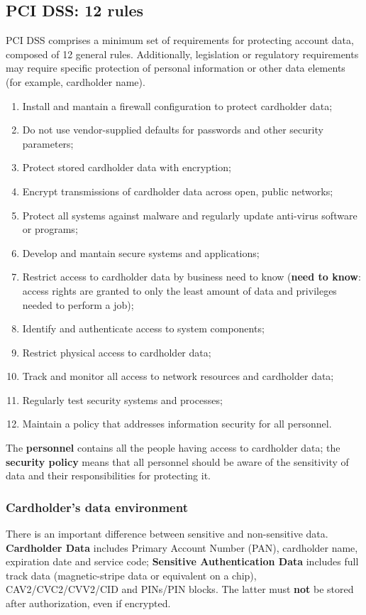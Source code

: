 \documentclass[a4paper, 10pt, titlepage]{article}
\begin{document}
\subsection{PCI DSS: 12 rules}
PCI DSS comprises a minimum set of requirements for protecting account data, composed of 12 general rules. Additionally, legislation or regulatory requirements may require specific protection of personal information or other data elements (for example, cardholder name).
\begin{enumerate}
\item Install and mantain a firewall configuration to protect cardholder data;
\item Do not use vendor-supplied defaults for passwords and other security parameters;
\item Protect stored cardholder data with encryption;
\item Encrypt transmissions of cardholder data across open, public networks;
\item Protect all systems against malware and regularly update anti-virus software or programs;
\item Develop and mantain secure systems and applications;
\item Restrict access to cardholder data by business need to know (\textbf{need to know}: access rights are granted to only the least amount of data and privileges needed to perform a job);
\item Identify and authenticate access to system components;
\item Restrict physical access to cardholder data;
\item Track and monitor all access to network resources and cardholder data;
\item Regularly test security systems and processes;
\item Maintain a policy that addresses information security for all personnel.
\end{enumerate}
The \textbf{personnel} contains all the people having access to cardholder data; the \textbf{security policy} means that all personnel should be aware of the sensitivity of data and their responsibilities for protecting it.

\subsubsection{Cardholder's data environment}
There is an important difference between sensitive and non-sensitive data.
\textbf{Cardholder Data} includes Primary Account Number (PAN), cardholder name, expiration date and service code; \textbf{Sensitive Authentication Data} includes full track data (magnetic-stripe data or equivalent on a chip), CAV2/CVC2/CVV2/CID and PINs/PIN blocks. The latter must \textbf{not} be stored after authorization, even if encrypted.
\end{document}
